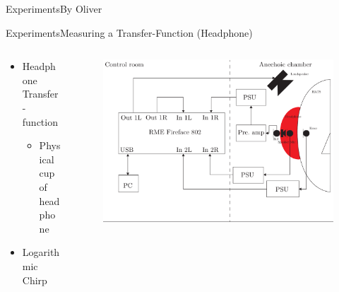 \begin{frame}{Experiments}{By Oliver}
\begin{frame}{Experiments}{Measuring a Transfer-Function (Headphone)}		
	\begin{columns}
		\begin{column}{0.3\textwidth}
			\begin{itemize}
				\item Headphone Transfer-function
				\begin{itemize}
					\item Physical cup of headphone
				\end{itemize}
				\item{Logarithmic Chirp}
			\end{itemize}
		\end{column}
		\begin{column}{0.7\textwidth} 
			\begin{figure}[h]
				\includegraphics[width=1\textwidth]{figures/AngleOfIncidenceSetup.pdf}
			\end{figure}
		\end{column}
	\end{columns}
\end{frame}


\end{frame}
